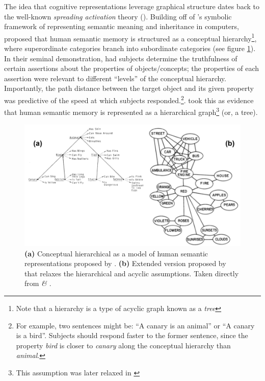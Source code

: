 \documentclass[12pt]{article}
\let\oldcite=\cite
\let\oldtextcite=\textcite
\renewcommand{\cite}[1]{\textcolor[rgb]{0, .121, .388}{\oldcite{#1}}}
\renewcommand{\textcite}[1]{\textcolor[rgb]{0, .121, .388}{\oldtextcite{#1}}}
\begin{document}
The idea that cognitive representations leverage graphical structure dates back to the well-known \emph{spreading activation} theory (\cite{collins1969retrieval,collins1975spreading}). Building off of \textcite{quillian1967word}'s symbolic framework of representing semantic meaning and inheritance in computers, \textcite{collins1969retrieval} proposed that human semantic memory is structured as a conceptual hierarchy\footnote{Note that a hierarchy is a type of acyclic graph known as a \emph{tree}}, where superordinate categories branch into subordinate categories (see figure \ref{fig:spreading-activation}). In their seminal demonstration, \textcite{collins1969retrieval} had subjects determine the truthfulness of certain assertions about the properties of objects/concepts; the properties of each assertion were relevant to different ``levels'' of the conceptual hierarchy. Importantly, the path distance between the target object and its given property was predictive of the speed at which subjects responded.\footnote{For example, two sentences might be: ``A canary is an animal'' or ``A canary is a bird''. Subjects should respond faster to the former sentence, since the property \emph{bird} is closer to \emph{canary} along the conceptual hierarchy than \emph{animal}.}. \textcite{collins1969retrieval} took this as evidence that human semantic memory is represented as a hierarchical graph\footnote{This assumption was later relaxed in \textcite{collins1975spreading}} (or, a tree).

\begin{figure}[h]
    \centering
    \label{fig:spreading-activation}
    \includegraphics[scale=.4]{figures/spreading-activation.png}
    \caption{\textbf{(a)} Conceptual hierarchical as a model of human semantic representations proposed by \textcite{collins1969retrieval}. \textbf{(b)} Extended version proposed by \textcite{collins1975spreading} that relaxes the hierarchical and acyclic assumptions. Taken directly from \emph{\textcite{collins1969retrieval} \& \textcite{collins1975spreading}}.}
\end{figure} 
\end{document}
